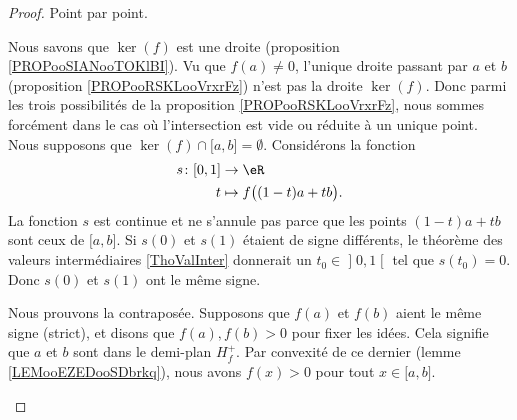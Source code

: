 \begin{proof}
	Point par point.
	\begin{subproof}
		Nous savons que \( \ker(f)\) est une droite (proposition \ref{PROPooSIANooTOKlBI}). Vu que \( f(a)\neq 0\), l'unique droite passant par \( a\) et \( b\) (proposition \ref{PROPooRSKLooVrxrFz}) n'est pas la droite \( \ker(f)\). Donc parmi les trois possibilités de la proposition \ref{PROPooRSKLooVrxrFz}, nous sommes forcément dans le cas où l'intersection est vide ou réduite à un unique point.
		Nous supposons que \( \ker(f)\cap\mathopen[ a , b \mathclose]=\emptyset\). Considérons la fonction
		\begin{equation}
			\begin{aligned}
				s\colon \mathopen[ 0 , 1 \mathclose] & \to \eR                         \\
				t                                    & \mapsto f\big( (1-t)a+tb \big).
			\end{aligned}
		\end{equation}
		La fonction \( s\) est continue et ne s'annule pas parce que les points \( (1-t)a+tb\) sont ceux de \( \mathopen[ a , b \mathclose]\). Si \( s(0)\) et \( s(1)\) étaient de signe différents, le théorème des valeurs intermédiaires \ref{ThoValInter} donnerait un \( t_0\in\mathopen] 0 , 1 \mathclose[\) tel que \( s(t_0)=0\). Donc \( s(0)\) et \( s(1)\) ont le même signe.

		Nous prouvons la contraposée. Supposons que \( f(a)\) et \( f(b)\) aient le même signe (strict), et disons que \( f(a), f(b)>0\) pour fixer les idées. Cela signifie que \( a\) et \( b\) sont dans le demi-plan \( H_f^+\). Par convexité de ce dernier (lemme \ref{LEMooEZEDooSDbrkq}), nous avons \( f(x)>0\) pour tout \( x\in\mathopen[ a , b \mathclose]\).

	\end{subproof}
\end{proof}

